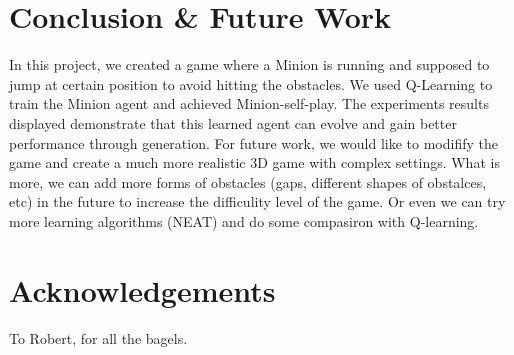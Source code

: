 \documentclass{acmsiggraph}
\begin{document}
\section{Conclusion \& Future Work}
In this project, we created a game where a Minion is running and supposed to jump at certain position to avoid hitting the obstacles. We used Q-Learning to train the Minion agent and achieved Minion-self-play. The experiments results displayed demonstrate that this learned agent can evolve and gain better performance through generation. 
For future work, we would like to modifify the game and create a much more realistic 3D game with complex settings. What is more, we can add more forms of obstacles (gaps, different shapes of obstalces, etc) in the future to increase the difficulity level of the game. Or even we can try more learning algorithms (NEAT) and do some compasiron with Q-learning.


\section*{Acknowledgements}

To Robert, for all the bagels.


\nocite{*}

\end{document}
